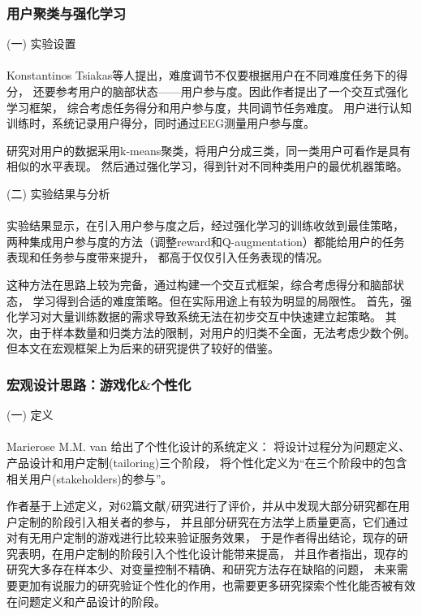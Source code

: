 \documentclass{article}
\begin{document}
            \subsubsection{用户聚类与强化学习}
            (一) 实验设置\paragraph{}
            Konstantinos Tsiakas等人提出，难度调节不仅要根据用户在不同难度任务下的得分，
            还要参考用户的脑部状态——用户参与度。因此作者提出了一个交互式强化学习框架，
            综合考虑任务得分和用户参与度，共同调节任务难度。
            用户进行认知训练时，系统记录用户得分，同时通过EEG测量用户参与度。

            研究对用户的数据采用k-means聚类，将用户分成三类，同一类用户可看作是具有相似的水平表现。
            然后通过强化学习，得到针对不同种类用户的最优机器策略。

            (二) 实验结果与分析\paragraph{}
            实验结果显示，在引入用户参与度之后，经过强化学习的训练收敛到最佳策略，
            两种集成用户参与度的方法（调整reward和Q-augmentation）都能给用户的任务表现和任务参与度带来提升，
            都高于仅仅引入任务表现的情况。

            这种方法在思路上较为完备，通过构建一个交互式框架，综合考虑得分和脑部状态，
            学习得到合适的难度策略。但在实际用途上有较为明显的局限性。
            首先，强化学习对大量训练数据的需求导致系统无法在初步交互中快速建立起策略。
            其次，由于样本数量和归类方法的限制，对用户的归类不全面，无法考虑少数个例。
            但本文在宏观框架上为后来的研究提供了较好的借鉴。

            \subsubsection{宏观设计思路：游戏化\&个性化}
            (一) 定义\paragraph{}
            Marierose M.M. van 给出了个性化设计的系统定义：
            将设计过程分为问题定义、产品设计和用户定制(tailoring)三个阶段，
            将个性化定义为“在三个阶段中的包含相关用户(stakeholders)的参与”。

            作者基于上述定义，对62篇文献/研究进行了评价，并从中发现大部分研究都在用户定制的阶段引入相关者的参与，
            并且部分研究在方法学上质量更高，它们通过对有无用户定制的游戏进行比较来验证服务效果，
            于是作者得出结论，现存的研究表明，在用户定制的阶段引入个性化设计能带来提高，
            并且作者指出，现存的研究大多存在样本少、对变量控制不精确、和研究方法存在缺陷的问题，
            未来需要更加有说服力的研究验证个性化的作用，也需要更多研究探索个性化能否被有效在问题定义和产品设计的阶段。
\end{document}
